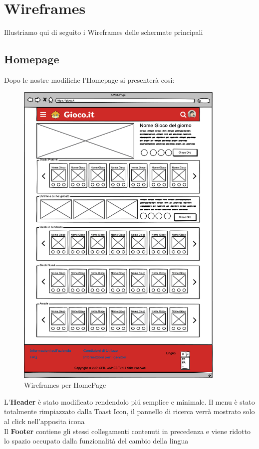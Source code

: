 \documentclass[../Report.tex]{subfiles}
\begin{document}
    \section{Wireframes}
    Illustriamo qui di seguito i Wireframes delle schermate principali

    \subsection{Homepage}
    Dopo le nostre modifiche l'Homepage si presenterà cosi:

    \begin{figure}[H]
        \centering
        \includegraphics[width=10cm]{WHomepage.png}
        \caption{Wireframes per HomePage}
    \end{figure}

         L'\textbf{Header} è stato modificato rendendolo piú semplice e minimale. Il menu è stato totalmente rimpiazzato dalla Toast Icon, il pannello di ricerca verrà mostrato solo al click nell'apposita icona\\
         
         Il \textbf{Footer} contiene gli stessi collegamenti contenuti in precedenza e viene ridotto lo spazio occupato dalla funzionalità del cambio della lingua\\
\end{document}

